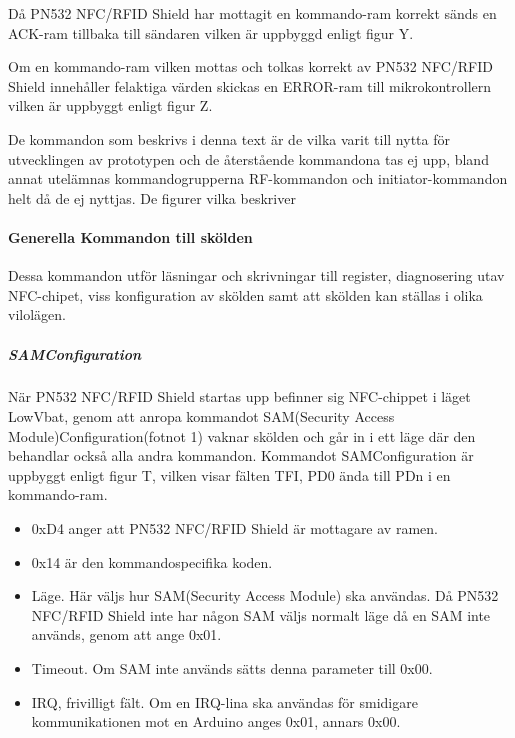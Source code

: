 \documentclass[11pt]{article}
\begin{document}
Då PN532 NFC/RFID Shield har mottagit en kommando-ram korrekt sänds en ACK-ram tillbaka till sändaren vilken är uppbyggd enligt figur Y.


Om en kommando-ram vilken mottas och tolkas korrekt av PN532 NFC/RFID Shield innehåller felaktiga värden skickas en ERROR-ram till mikrokontrollern vilken är uppbyggt enligt figur Z.


De kommandon som beskrivs i denna text är de vilka varit till nytta för utvecklingen av prototypen och de återstående kommandona tas ej upp, bland annat utelämnas kommandogrupperna RF-kommandon och initiator-kommandon helt då de ej nyttjas. De figurer vilka beskriver 

\paragraph{Generella Kommandon till skölden}
Dessa kommandon utför läsningar och skrivningar till register, diagnosering utav NFC-chipet, viss konfiguration av skölden samt att skölden kan ställas i olika vilolägen. 

\subparagraph{SAMConfiguration}
När PN532 NFC/RFID Shield startas upp befinner sig NFC-chippet i läget LowVbat, genom att anropa kommandot SAM(Security Access Module)Configuration(fotnot 1) vaknar skölden och går in i ett läge där den behandlar också alla andra kommandon. Kommandot SAMConfiguration är uppbyggt enligt figur T, vilken visar fälten TFI, PD0 ända till PDn i en kommando-ram. 

\begin{itemize}
\item 0xD4 anger att PN532 NFC/RFID Shield är mottagare av ramen.
\item 0x14 är den kommandospecifika koden.
\item Läge. Här väljs hur SAM(Security Access Module) ska användas. Då PN532 NFC/RFID Shield inte har någon SAM väljs normalt läge då en SAM inte används, genom att ange 0x01.
\item Timeout. Om SAM inte används sätts denna parameter till 0x00.
\item IRQ, frivilligt fält. Om en IRQ-lina ska användas för smidigare kommunikationen mot en Arduino anges 0x01, annars 0x00.
\end{itemize}
\end{document}
